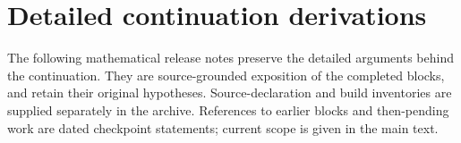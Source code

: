 \clearpage
\section{Detailed continuation derivations}\label{app:continuation}
The following mathematical release notes preserve the detailed arguments
behind the continuation. They are source-grounded exposition of the completed
blocks, and retain their original hypotheses. Source-declaration and build
inventories are supplied separately in the archive. References to earlier
blocks and then-pending work are dated checkpoint statements; current scope
is given in the main text.












